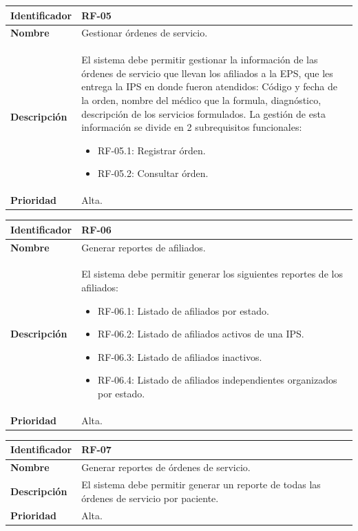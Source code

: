 \documentclass[12pt,a4paper]{article}
\begin{document}
\begin{center}
\begin{tabular}{|m{5.5cm}|m{9.5cm}|}
\hline
\textbf{Identificador} & RF-05\\
\hline
\textbf{Nombre} & Gestionar órdenes de servicio.\\
\hline
\textbf{Descripción} & El sistema debe permitir gestionar la información de las órdenes de servicio que llevan los afiliados a la EPS, que les entrega la IPS en donde fueron atendidos: Código y fecha de la orden, nombre del médico que la formula, diagnóstico, descripción de los servicios formulados. La gestión de esta información se divide en 2 subrequisitos funcionales:
\begin{itemize}
\item RF-05.1: Registrar órden.
\item RF-05.2: Consultar órden.
\end{itemize}\\
\hline
\textbf{Prioridad} & Alta.\\
\hline
\end{tabular}
\vspace{5mm}

\begin{tabular}{|m{5.5cm}|m{9.5cm}|}
\hline
\textbf{Identificador} & RF-06\\
\hline
\textbf{Nombre} & Generar reportes de afiliados.\\
\hline
\textbf{Descripción} & El sistema debe permitir generar los siguientes reportes de los afiliados:
\begin{itemize}
\item RF-06.1: Listado de afiliados por estado.
\item RF-06.2: Listado de afiliados activos de una IPS.
\item RF-06.3: Listado de afiliados inactivos.
\item RF-06.4: Listado de afiliados independientes organizados por estado.
\end{itemize}\\
\hline
\textbf{Prioridad} & Alta.\\
\hline
\end{tabular}
\vspace{5mm}

\begin{tabular}{|m{5.5cm}|m{9.5cm}|}
\hline
\textbf{Identificador} & RF-07\\
\hline
\textbf{Nombre} & Generar reportes de órdenes de servicio.\\
\hline
\textbf{Descripción} & El sistema debe permitir generar un reporte de todas las órdenes de servicio por paciente.\\
\hline
\textbf{Prioridad} & Alta.\\
\hline
\end{tabular}
\vspace{5mm}


\end{center}
\end{document}

